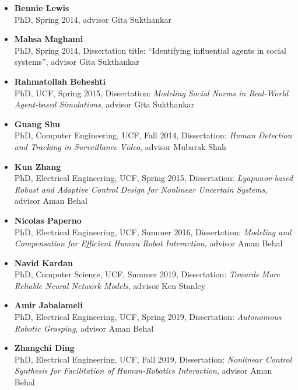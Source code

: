 \begin{itemize}
\item\textbf{Bennie Lewis}\\
PhD, Spring 2014, advisor Gita Sukthankar

\item\textbf{Mahsa Maghami}\\
PhD, Spring 2014, Dissertation title: ``Identifying influential agents in social systems'', advisor Gita Sukthankar

\item\textbf{Rahmatollah Beheshti}\\
PhD, UCF, Spring 2015, Dissertation: {\em Modeling Social Norms in Real-World Agent-based Simulations}, advisor Gita Sukthankar

\item\textbf{Guang Shu} \\
PhD, Computer Engineering, UCF, Fall 2014, Dissertation: {\em Human Detection and Tracking in Surveillance Video}, advisor Mubarak Shah

\item\textbf{Kun Zhang}\\
PhD, Electrical Engineering, UCF, Spring 2015, Dissertation: {\em Lyapunov-based Robust and Adaptive Control Design for Nonlinear Uncertain Systems}, advisor Aman Behal

\item\textbf{Nicolas Paperno}\\
PhD, Electrical Engineering, UCF, Summer 2016, Dissertation: {\em Modeling and Compensation for Efficient Human Robot Interaction}, advisor Aman Behal

\item\textbf{Navid Kardan} \\
PhD, Computer Science, UCF, Summer 2019, Dissertation: {\em Towards More Reliable Neural Network Models}, advisor Ken Stanley %

\item\textbf{Amir Jabalameli} \\
PhD, Electrical Engineering, UCF, Spring 2019, Dissertation: {\em Autonomous Robotic Grasping},  advisor Aman Behal

\item\textbf{Zhangchi Ding} \\
PhD, Electrical Engineering, UCF, Fall 2019, Dissertation: {\em Nonlinear Control Synthesis for Facilitation of Human-Robotics Interaction},
advisor Aman Behal %


\end{itemize}
